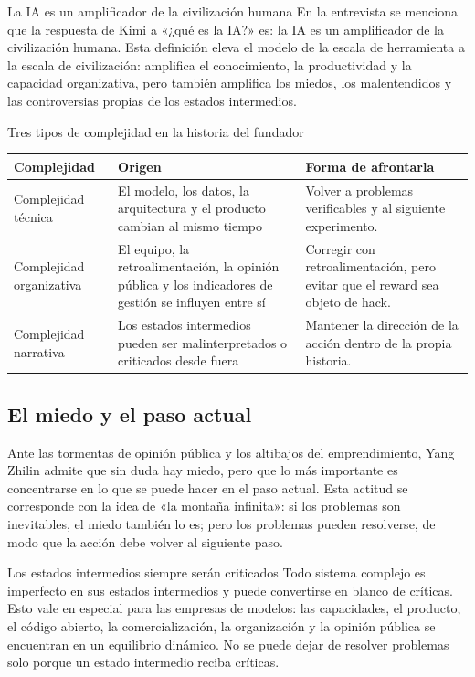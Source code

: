 \begin{importantbox}{La IA es un amplificador de la civilización humana}
En la entrevista se menciona que la respuesta de Kimi a «¿qué es la IA?» es: la IA es un amplificador de la civilización humana. Esta definición eleva el modelo de la escala de herramienta a la escala de civilización: amplifica el conocimiento, la productividad y la capacidad organizativa, pero también amplifica los miedos, los malentendidos y las controversias propias de los estados intermedios.
\end{importantbox}

\begin{knowledgebox}{Tres tipos de complejidad en la historia del fundador}
\begin{tabularx}{\textwidth}{p{}p{}X}
\toprule
Complejidad & Origen & Forma de afrontarla \\
\midrule
Complejidad técnica & El modelo, los datos, la arquitectura y el producto cambian al mismo tiempo & Volver a problemas verificables y al siguiente experimento. \\
Complejidad organizativa & El equipo, la retroalimentación, la opinión pública y los indicadores de gestión se influyen entre sí & Corregir con retroalimentación, pero evitar que el reward sea objeto de hack. \\
Complejidad narrativa & Los estados intermedios pueden ser malinterpretados o criticados desde fuera & Mantener la dirección de la acción dentro de la propia historia. \\
\bottomrule
\end{tabularx}
\end{knowledgebox}

\subsection{El miedo y el paso actual}

Ante las tormentas de opinión pública y los altibajos del emprendimiento, Yang Zhilin admite que sin duda hay miedo, pero que lo más importante es concentrarse en lo que se puede hacer en el paso actual. Esta actitud se corresponde con la idea de «la montaña infinita»: si los problemas son inevitables, el miedo también lo es; pero los problemas pueden resolverse, de modo que la acción debe volver al siguiente paso.

\begin{warningbox}{Los estados intermedios siempre serán criticados}
Todo sistema complejo es imperfecto en sus estados intermedios y puede convertirse en blanco de críticas. Esto vale en especial para las empresas de modelos: las capacidades, el producto, el código abierto, la comercialización, la organización y la opinión pública se encuentran en un equilibrio dinámico. No se puede dejar de resolver problemas solo porque un estado intermedio reciba críticas.
\end{warningbox}


